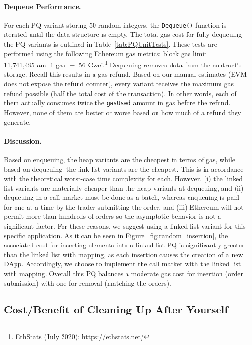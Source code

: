\paragraph{Dequeue Performance.} For each PQ variant storing 50 random integers, the \texttt{Dequeue()} function is iterated until the data structure is empty. The total gas cost for fully dequeuing the PQ variants is outlined in Table~\ref{tab:PQUnitTests}. These tests are performed using the following Ethereum gas metrics: block gas limit $=$11,741,495 and 1 gas $=$ 56 Gwei.\footnote{EthStats (July 2020): \url{https://ethstats.net/}} Dequeuing removes data from the contract's storage. Recall this results in a gas refund. Based on our manual estimates (EVM does not expose the refund counter), every variant receives the maximum gas refund possible (\ie half the total cost of the transaction). In other words, each of them actually consumes twice the \texttt{gasUsed} amount in gas before the refund. However, none of them are better or worse based on how much of a refund they generate.  

\paragraph{Discussion.} Based on enqueuing, the heap variants are the cheapest in terms of gas, while based on dequeuing, the link list variants are the cheapest. This is in accordance with the theoretical worst-case time complexity for each. However, (i) the linked list variants are materially cheaper than the heap variants at dequeuing, and (ii) dequeuing in a call market must be done as a batch, whereas enqueuing is paid for one at a time by the trader submitting the order, and (iii) Ethereum will not permit more than hundreds of orders so the asymptotic behavior is not a significant factor. For these reasons, we suggest using a linked list variant for this specific application. As it can be seen in Figure~\ref{fig:random_insertion}, the associated cost for inserting elements into a linked list PQ is significantly greater than the linked list with mapping, as each insertion causes the creation of a new DApp. Accordingly, we choose to implement the call market with the linked list with mapping. Overall this PQ balances a moderate gas cost for insertion (\ie order submission) with one for removal (\ie matching the orders). 


\subsection{Cost/Benefit of Cleaning Up After Yourself}
\label{sec:gasrefund}

